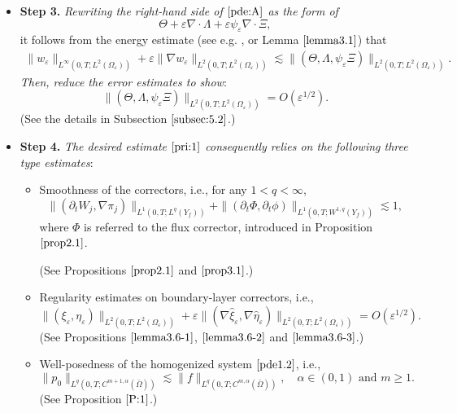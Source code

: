\documentclass[13pt,CJK]{article}
\theoremstyle{plain}                       %
\theoremstyle{remark}
\numberwithin{equation}{section}
\begin{document}
\begin{itemize}
\begin{itemize}
\item \textbf{Step 3.}
\emph{Rewriting the right-hand side of $\eqref{pde:A}$
as the form of}
\begin{equation*}
\Theta+\varepsilon\nabla\cdot \Lambda+
\varepsilon\psi_{\varepsilon}
\nabla\cdot \Xi,
\end{equation*}
it follows from the energy estimate (see e.g. \cite{Temam79}, or
Lemma $\ref{lemma3.1}$) that
\begin{equation*}
\begin{aligned}
\|w_{\varepsilon}\|_{L^{\infty}
(0,T;L^2(\Omega_{\varepsilon}))}
+\varepsilon
\|\nabla w_{\varepsilon}\|_{L^{2}
(0,T;L^2(\Omega_{\varepsilon}))}
\lesssim
\|(\Theta,\Lambda,\psi_{\varepsilon}\Xi)\|_{L^2(0,T;L^2(\Omega_{\varepsilon}))}.
\end{aligned}
\end{equation*}
\emph{Then, reduce the error estimates
to show}:
\begin{equation}\label{pri:1}
\|(\Theta,\Lambda,\psi_\varepsilon\Xi)\|_{L^2(0,T;L^2(\Omega_{\varepsilon}))}
= O(\varepsilon^{1/2}).
\end{equation}
(See the details in Subsection $\ref{subsec:5.2}$.)

\item \textbf{Step 4.}
\emph{The desired estimate $\eqref{pri:1}$ consequently relies on
the following three type estimates}:
\begin{itemize}
  \item Smoothness of the correctors, i.e., for any $1<q<\infty$,
  \begin{equation}\label{pri:7}
\|(\partial_t W_j,\nabla \pi_j)\|_{L^1(0,T;L^q(Y_f))}
+\|(\partial_t\Phi,\partial_t\phi)\|_{L^1(0,T;W^{1,q}(Y_f))}\lesssim 1,
  \end{equation}
where $\Phi$ is referred to the flux corrector, introduced in Proposition $\ref{prop2.1}$.

(See Propositions $\ref{prop2.1}$ and $\ref{prop3.1}$.)
  \item Regularity estimates on boundary-layer correctors,
i.e.,
  \begin{equation}\label{pri:6}
  \|(\xi_{\varepsilon},\eta_{\varepsilon})\|_{L^2(0,T;L^2(\Omega_\varepsilon))}
  +\varepsilon\|(\nabla\widehat\xi_{\varepsilon},\nabla\widehat\eta_{\varepsilon})\|_{L^2(0,T;L^2(\Omega_\varepsilon))}
  =O(\varepsilon^{1/2}).
  \end{equation}
(See Propositions
$\ref{lemma3.6-1}$, $\ref{lemma3.6-2}$ and
$\ref{lemma3.6-3}$.)
\item Well-posedness of the homogenized system $\eqref{pde1.2}$,
i.e.,
  \begin{equation}\label{pri:8}
\|p_0\|_{L^q(0,T;C^{m+1,\alpha}(\bar{\Omega}))}\lesssim
\|f\|_{L^q(0,T;C^{m,\alpha}(\bar{\Omega}))},
\quad \alpha\in(0,1)\text{~and~}m\geq 1.
\end{equation}
(See Proposition $\ref{P:1}$.)
\end{itemize}



\end{itemize}
\end{itemize}
\end{document}
